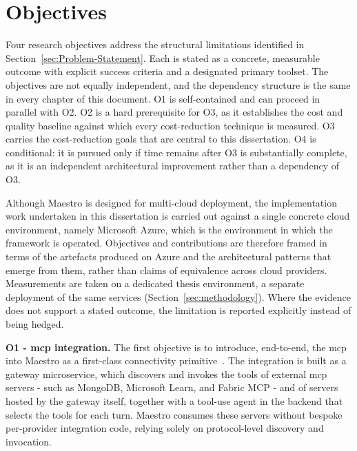 \section{Objectives}
\label{sec:objectives}

Four research objectives address the structural limitations identified in
Section~\ref{sec:Problem-Statement}. Each is stated as a concrete, measurable
outcome with explicit success criteria and a designated primary toolset. The
objectives are not equally independent, and the dependency structure is the
same in every chapter of this document. O1 is self-contained and can proceed in
parallel with O2. O2 is a hard prerequisite for O3, as it establishes the cost
and quality baseline against which every cost-reduction technique is measured.
O3 carries the cost-reduction goals that are central to this dissertation. O4
is conditional: it is pursued only if time remains after O3 is substantially
complete, as it is an independent architectural improvement rather than a
dependency of O3.

Although Maestro is designed for multi-cloud deployment, the implementation
work undertaken in this dissertation is carried out against a single concrete
cloud environment, namely Microsoft Azure, which is the environment in which
the framework is operated. Objectives and contributions are therefore framed in
terms of the artefacts produced on Azure and the architectural patterns that
emerge from them, rather than claims of equivalence across cloud providers.
Measurements are taken on a dedicated thesis environment, a separate deployment
of the same services (Section~\ref{sec:methodology}). Where the evidence does
not support a stated outcome, the limitation is reported explicitly instead of
being hedged.

\textbf{O1 - \gls{mcp} integration.} The first objective is to introduce,
end-to-end, the \gls{mcp} into Maestro as a first-class connectivity
primitive~\cite{anthropic2024mcp, modelcontextprotocol2024}. The integration
is built as a gateway microservice, which discovers and invokes the tools of
external \gls{mcp} servers - such as MongoDB, Microsoft Learn, and Fabric MCP -
and of servers hosted by the gateway itself, together with a tool-use agent in
the backend that selects the tools for each turn. Maestro consumes these
servers without bespoke per-provider integration code, relying solely on
protocol-level discovery and invocation.

